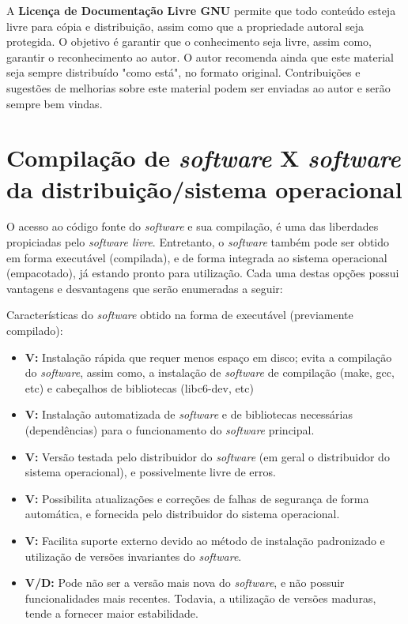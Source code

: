     A {\bf Licença de Documentação Livre GNU} permite que todo conteúdo
esteja livre para cópia e distribuição, assim como que a propriedade autoral
seja protegida. O objetivo é garantir que o conhecimento seja livre, assim como,
garantir o reconhecimento ao autor. O autor recomenda ainda que este material
seja sempre distribuído "como está", no formato original. Contribuições e
sugestões de melhorias sobre este material podem ser enviadas ao autor e serão
sempre bem vindas.

\section{Compilação de {\it software} X {\it software} da distribuição/sistema operacional}\setcounter{SteP}{1}

    O acesso ao código fonte do {\it software} e sua compilação, é uma das
liberdades propiciadas pelo {\it software livre}. Entretanto, o {\it software}
também pode ser obtido em forma executável (compilada), e de forma integrada
ao sistema operacional (empacotado), já estando pronto para utilização.
Cada uma destas opções possui vantagens e desvantagens que serão enumeradas
a seguir:

    Características do {\it software} obtido na forma de executável (previamente compilado):

\begin{itemize}
\item{\bf } {\bf V:} Instalação rápida que requer menos espaço em disco; evita a
compilação do {\it software}, assim como, a instalação de {\it software} de compilação
(make, gcc, etc) e cabeçalhos de bibliotecas (libc6-dev, etc)

\item{\bf } {\bf V:} Instalação automatizada de {\it software} e de bibliotecas
necessárias (dependências) para o funcionamento do {\it software} principal.

\item{\bf } {\bf V:} Versão testada pelo distribuidor do {\it software} (em geral
o distribuidor do sistema operacional), e possivelmente livre de erros.

\item{\bf } {\bf V:} Possibilita atualizações e correções de falhas de segurança
de forma automática, e fornecida pelo distribuidor do sistema operacional.

\item{\bf } {\bf V:} Facilita suporte externo devido ao método de instalação
padronizado e utilização de versões invariantes do {\it software}.

\item{\bf } {\bf V/D:} Pode não ser a versão mais nova do {\it software}, e não
possuir funcionalidades mais recentes. Todavia, a utilização de versões 
maduras, tende a fornecer maior estabilidade.

\end{itemize}



